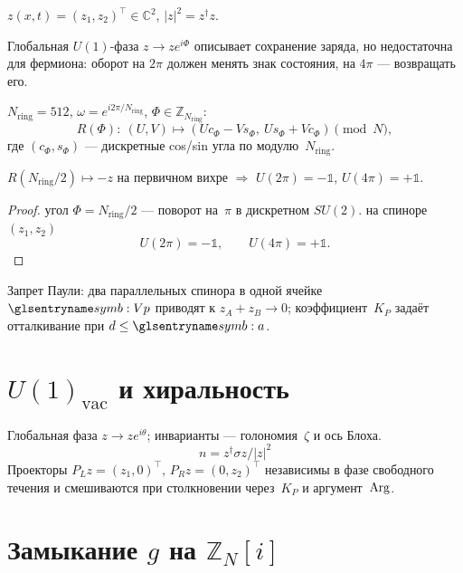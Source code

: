 \begin{definition}
$z(x,t)=(z_1,z_2)^\top\in\mathbb{C}^2$, $|z|^2=z^\dagger z$.
\end{definition}

Глобальная $U(1)$-фаза $z\to z e^{i\Phi}$ описывает сохранение заряда,
но недостаточна для фермиона: оборот на $2\pi$ должен менять знак состояния,
на $4\pi$ --- возвращать его.

\begin{definition}
\label{def:discrete-rotator}
$N_{\mathrm{ring}}=512$, $\omega=e^{i2\pi/N_{\mathrm{ring}}}$, $\Phi\in\mathbb{Z}_{N_{\mathrm{ring}}}$:
\[
  R(\Phi):\ (U,V)\mapsto (U c_\Phi - V s_\Phi,\ U s_\Phi + V c_\Phi)\pmod N,
\]
где $(c_\Phi,s_\Phi)$ --- дискретные cos/sin угла по модулю~$N_{\mathrm{ring}}$.
\end{definition}

\begin{corollary}[Спин $1/2$]
$R(N_{\mathrm{ring}}/2)\mapsto -z$ на первичном вихре $\Rightarrow$
$U(2\pi)=-\mathbb{1}$, $U(4\pi)=+\mathbb{1}$.
\end{corollary}

\begin{proof}
угол $\Phi=N_{\mathrm{ring}}/2$ --- поворот на~$\pi$ в дискретном $SU(2)$.
\pfollows
на спиноре $(z_1,z_2)$
\[
  U(2\pi)=-\mathbb{1},\qquad U(4\pi)=+\mathbb{1}.
\]
\end{proof}

Запрет Паули: два параллельных спинора в одной ячейке~$\PlanckCell$
приводят к $z_A+z_B\to 0$; коэффициент~$K_P$ задаёт отталкивание при $d\le\caStepSpace$.

\section{$U(1)_{\mathrm{vac}}$ и хиральность}

Глобальная фаза $z\to z e^{i\theta}$; инварианты --- голономия~$\zeta$
и ось Блоха.
\[
n=z^\dagger\sigma z/|z|^2
\]
Проекторы $P_L z=(z_1,0)^\top$, $P_R z=(0,z_2)^\top$
независимы в фазе свободного течения и смешиваются при столкновении
через~$K_P$ и аргумент~$\operatorname{Arg}$.

\section{Замыкание \texorpdfstring{$g$}{g} на \texorpdfstring{$\mathbb{Z}_N[i]$}{Z\_N[i]}}
\label{sec:g-law}

